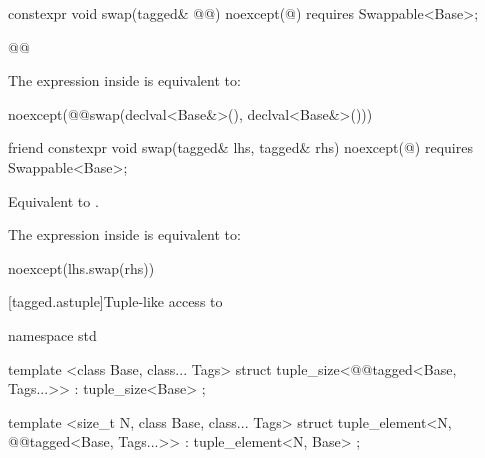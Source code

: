 {
\begin{itemdecl}
constexpr void swap(tagged& @@) noexcept(@\seebelow@)
  requires Swappable<Base>;
\end{itemdecl}

\begin{itemdescr}
\pnum
\effects {} 
\begin{codeblock}
@@
\end{codeblock}

\pnum
{}

\pnum
\remarks The expression inside  is equivalent to:

\begin{codeblock}
noexcept(@@swap(declval<Base&>(), declval<Base&>()))
\end{codeblock}
\end{itemdescr}

%
\begin{itemdecl}
friend constexpr void swap(tagged& lhs, tagged& rhs) noexcept(@\seebelow@)
  requires Swappable<Base>;
\end{itemdecl}

\begin{itemdescr}
\pnum
\effects Equivalent to .

\pnum
\remarks The expression inside  is equivalent to:

\begin{codeblock}
noexcept(lhs.swap(rhs))
\end{codeblock}
\end{itemdescr}

[tagged.astuple]{Tuple-like access to }

%
%
\begin{itemdecl}
namespace std {
  template <class Base, class... Tags>
  struct tuple_size<@@tagged<Base, Tags...>>
    : tuple_size<Base> { };

  template <size_t N, class Base, class... Tags>
  struct tuple_element<N, @@tagged<Base, Tags...>>
    : tuple_element<N, Base> { };
}
\end{itemdecl}

}
